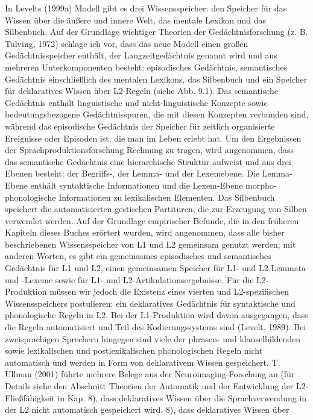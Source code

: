 \documentclass[
  letterpaper,
]{scrbook}
\begin{document}
In Levelts (1999a) Modell gibt es drei Wissensspeicher: den Speicher für
das Wissen über die äußere und innere Welt, das mentale Lexikon und das
Silbenbuch. Auf der Grundlage wichtiger Theorien der Gedächtnisforschung
(z. B. Tulving, 1972) schlage ich vor, dass das neue Modell einen großen
Gedächtnisspeicher enthält, der Langzeitgedächtnis genannt wird und aus
mehreren Unterkomponenten besteht: episodisches Gedächtnis, semantisches
Gedächtnis einschließlich des mentalen Lexikons, das Silbenbuch und ein
Speicher für deklaratives Wissen über L2-Regeln (siehe Abb. 9.1). Das
semantische Gedächtnis enthält linguistische und nicht-linguistische
Konzepte sowie bedeutungsbezogene Gedächtnisspuren, die mit diesen
Konzepten verbunden sind, während das episodische Gedächtnis der
Speicher für zeitlich organisierte Ereignisse oder Episoden ist, die man
im Leben erlebt hat. Um den Ergebnissen der Sprachproduktionsforschung
Rechnung zu tragen, wird angenommen, dass das semantische Gedächtnis
eine hierarchische Struktur aufweist und aus drei Ebenen besteht: der
Begriffs-, der Lemma- und der Lexemebene. Die Lemma-Ebene enthält
syntaktische Informationen und die Lexem-Ebene morpho-phonologische
Informationen zu lexikalischen Elementen. Das Silbenbuch speichert die
automatisierten gestischen Partituren, die zur Erzeugung von Silben
verwendet werden. Auf der Grundlage empirischer Befunde, die in den
früheren Kapiteln dieses Buches erörtert wurden, wird angenommen, dass
alle bisher beschriebenen Wissensspeicher von L1 und L2 gemeinsam
genutzt werden; mit anderen Worten, es gibt ein gemeinsames episodisches
und semantisches Gedächtnis für L1 und L2, einen gemeinsamen Speicher
für L1- und L2-Lemmata und -Lexeme sowie für L1- und
L2-Artikulationsergebnisse. Für die L2-Produktion müssen wir jedoch die
Existenz eines vierten und L2-spezifischen Wissensspeichers postulieren:
ein deklaratives Gedächtnis für syntaktische und phonologische Regeln in
L2. Bei der L1-Produktion wird davon ausgegangen, dass die Regeln
automatisiert und Teil des Kodierungssystems sind (Levelt, 1989). Bei
zweisprachigen Sprechern hingegen sind viele der phrasen- und
klauselbildenden sowie lexikalischen und postlexikalischen
phonologischen Regeln nicht automatisch und werden in Form von
deklarativem Wissen gespeichert. T. Ullman (2001) führte mehrere Belege
aus der Neuroimaging-Forschung an (für Details siehe den Abschnitt
Theorien der Automatik und der Entwicklung der L2-Fließfähigkeit in Kap.
8), dass deklaratives Wissen über die Sprachverwendung in der L2 nicht
automatisch gespeichert wird. 8), dass deklaratives Wissen über
\end{document}
